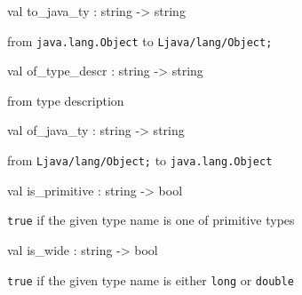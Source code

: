 \documentclass[11pt]{article}
\begin{document}
\label{val:Java.to-underscorejava-underscorety}\begin{ocamldoccode}
val to_java_ty : string -> string
\end{ocamldoccode}
\begin{ocamldocdescription}
from {\tt{java.lang.Object}} to {\tt{Ljava/lang/Object;}}


\end{ocamldocdescription}




\label{val:Java.of-underscoretype-underscoredescr}\begin{ocamldoccode}
val of_type_descr : string -> string
\end{ocamldoccode}
\begin{ocamldocdescription}
from type description


\end{ocamldocdescription}




\label{val:Java.of-underscorejava-underscorety}\begin{ocamldoccode}
val of_java_ty : string -> string
\end{ocamldoccode}
\begin{ocamldocdescription}
from {\tt{Ljava/lang/Object;}} to {\tt{java.lang.Object}}


\end{ocamldocdescription}




\label{val:Java.is-underscoreprimitive}\begin{ocamldoccode}
val is_primitive : string -> bool
\end{ocamldoccode}
\begin{ocamldocdescription}
{\tt{true}} if the given type name is one of primitive types


\end{ocamldocdescription}




\label{val:Java.is-underscorewide}\begin{ocamldoccode}
val is_wide : string -> bool
\end{ocamldoccode}
\begin{ocamldocdescription}
{\tt{true}} if the given type name is either {\tt{long}} or {\tt{double}}


\end{ocamldocdescription}
\end{document}
